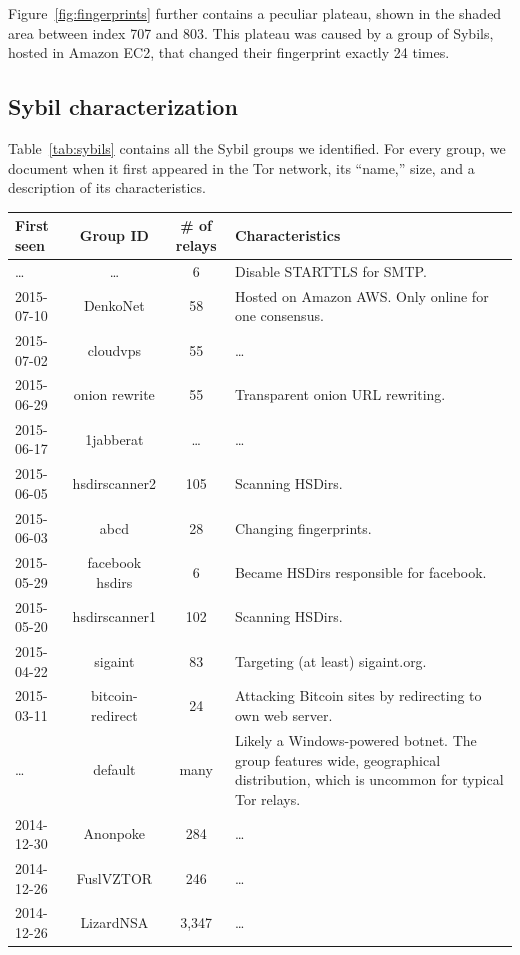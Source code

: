 Figure~\ref{fig:fingerprints} further contains a peculiar plateau, shown in the
shaded area between index 707 and 803.  This plateau was caused by a group of
Sybils, hosted in Amazon EC2, that changed their fingerprint exactly 24 times.

\subsection{Sybil characterization}
\label{sec:sybil_groups}
Table~\ref{tab:sybils} contains all the Sybil groups we identified.  For every
group, we document when it first appeared in the Tor network, its ``name,''
size, and a description of its characteristics.

\begin{table}[t]
\centering
\begin{tabular}{l c c p{10cm}}
\textbf{First seen} & \textbf{Group ID} & \textbf{\# of relays} & \textbf{Characteristics} \\
\hline
\ldots & \ldots & 6 & Disable STARTTLS for SMTP. \\
2015-07-10 & DenkoNet & 58 & Hosted on Amazon AWS.  Only online for one consensus. \\
2015-07-02 & cloudvps & 55 & \ldots \\
2015-06-29 & onion rewrite & 55 & Transparent onion URL rewriting. \\
2015-06-17 & 1jabberat & \ldots & \ldots \\
2015-06-05 & hsdirscanner2 & 105 & Scanning HSDirs. \\
2015-06-03 & abcd & 28 & Changing fingerprints. \\
2015-05-29 & facebook hsdirs & 6 & Became HSDirs responsible for facebook.  \\
2015-05-20 & hsdirscanner1 & 102 & Scanning HSDirs. \\
2015-04-22 & sigaint & 83 & Targeting (at least) sigaint.org. \\
2015-03-11 & bitcoin-redirect & 24 & Attacking Bitcoin sites by redirecting to own web server. \\
\ldots & default & many & Likely a Windows-powered botnet.  The group
features wide, geographical distribution, which is uncommon for typical Tor
relays. \\
2014-12-30 & Anonpoke & 284 & \ldots\\
2014-12-26 & FuslVZTOR & 246 & \ldots\\
2014-12-26 & LizardNSA & 3,347 & \ldots\\

\end{tabular}
\end{table}
